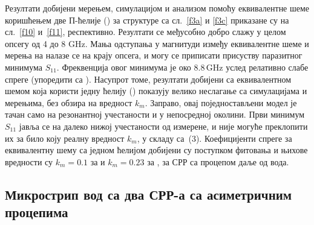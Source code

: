 Резултати добијени мерењем, симулацијом и анализом помоћу еквивалентне шеме коришћењем две П-ћелије () за структуре са сл.~\ref{f3a} и \ref{f3c} приказане су на сл.~\ref{f10} и~\ref{f11}, респективно. Резултати се међусобно добро слажу у целом опсегу од 4 до 8 GHz. Мања одступања у магнитуди између еквивалентне шеме и мерења на  налазе се на крају опсега, и могу се приписати присуству паразитног минимума $S_{11}$. Фреквенција овог минимума је око $\num{8.8}\,$GHz услед релативно слабе спреге (упоредити са ). Насупрот томе, резултати добијени са еквивалентном шемом која користи једну ћелију () показују велико неслагање са симулацијама и мерењима, без обзира на вредност $k_m$. Заправо, овај поједностављени модел је тачан само на резонантној учестаности и у непосредној околини. Први минимум $S_{11}$ јавља се на далеко нижој учестаности од измерене, и није могуће преклопити их за било коју реалну вредност $k_m$, у складу са~(3). Коефицијенти спреге за еквивалентну шему са једном ћелијом добијени су поступком фитовања и њихове вредности су $k_m=\num{0.1}$ за  и $k_m=\num{0.23}$ за , за СРР са процепом даље од вода.


\subsection{Микрострип вод са два СРР-а са асиметричним процепима}

